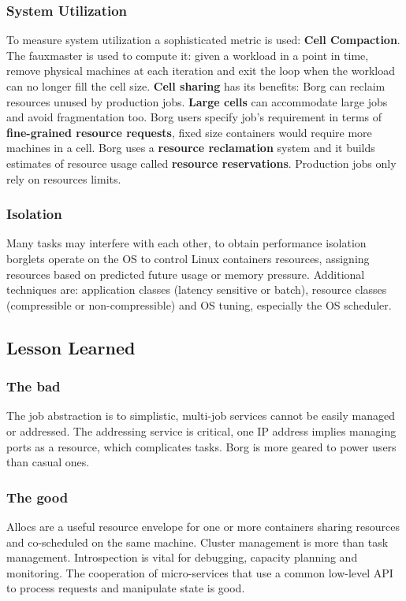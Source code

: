		\subsubsection{System Utilization}
		To measure system utilization a sophisticated metric is used: \textbf{Cell Compaction}. The fauxmaster is used to compute it: given a workload in a point in time, remove physical machines at each iteration and exit the loop when the workload can no longer fill the cell size.\newline
		\newline
		\textbf{Cell sharing} has its benefits: Borg can reclaim resources unused by production jobs.\newline
		\textbf{Large cells} can accommodate large jobs and avoid fragmentation too.\newline
		Borg users specify job's requirement in terms of \textbf{fine-grained resource requests}, fixed size containers would require more machines in a cell.\newline
		Borg uses a \textbf{resource reclamation} system and it builds estimates of resource usage called \textbf{resource reservations}. Production jobs only rely on resources limits.
		\subsubsection{Isolation}
		Many tasks may interfere with each other, to obtain performance isolation borglets operate on the OS to control Linux containers resources, assigning resources based on predicted future usage or memory pressure.\newline
		Additional techniques are: application classes (latency sensitive or batch), resource classes (compressible or non-compressible) and OS tuning, especially the OS scheduler.
	\subsection{Lesson Learned}
		\subsubsection{The bad}
		The job abstraction is to simplistic, multi-job services cannot be easily managed or addressed.\newline
		The addressing service is critical, one IP address implies managing ports as a resource, which complicates tasks.\newline
		Borg is more geared to power users than casual ones.
		\subsubsection{The good}
		Allocs are a useful resource envelope for one or more containers sharing resources and co-scheduled on the same machine.\newline
		Cluster management is more than task management.\newline
		Introspection is vital for debugging, capacity planning and monitoring.\newline
		The cooperation of micro-services that use a common low-level API to process requests and manipulate state is good.
	